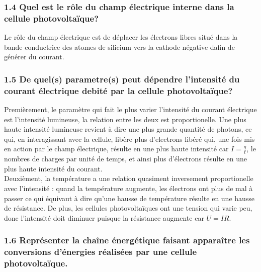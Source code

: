 \documentclass[a4paper,12pt]{scrartcl}
\begin{document}
\subsubsection*{1.4 Quel est le rôle du champ électrique interne dans la cellule photovoltaïque?}

Le rôle du champ électrique est de déplacer les électrons libres situé dans la bande conductrice des 
atomes de silicium vers la cathode négative dafin de générer du courant.

\subsubsection*{1.5 De quel(s) parametre(s) peut dépendre l'intensité du courant électrique debité par la cellule photovoltaïque?}

Premièrement, le paramètre qui fait le plus varier l'intensité du courant électrique est l'intensité lumineuse, la relation entre les deux 
est proportionelle. Une plus haute intensité lumineuse revient à dire une plus grande quantité de photons, ce qui, en interagissant avec
la cellule, libère plus d'electrons libéré qui, une fois mis en action par le champ électrique, résulte en une plus haute intensité car 
$I = \frac{q}{t}$, le nombres de charges par unité de temps, et ainsi plus d'électrons résulte en une plus haute intensité du courant.
\\
Deuxièment, la température a une relation quasiment inversement 
proportionelle avec l'intensité : quand la température augmente, les électrons ont plus de mal
à passer ce qui équivaut à dire qu'une hausse de température résulte en une hausse de résistance.
De plus, les cellules photovoltaïques ont une tension qui varie peu, donc l'intensité doit diminuer puisque la résistance
augmente car $U=IR$.

\subsubsection*{1.6 Représenter la chaîne énergétique faisant apparaître les conversions d'énergies réalisées par une cellule photovoltaïque.}
\begin{center}
\end{center}
\end{document}
